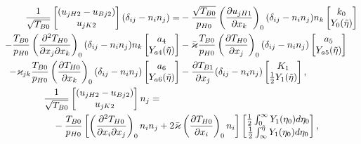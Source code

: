 \begin{gather}
    \begin{aligned}
        \frac1{\sqrt{T_{B0}}}
            \begin{bmatrix} (u_{jH2} - u_{Bj2}) \\ u_{jK2} \end{bmatrix}\deltann{i}{j} =
        &- \frac{\sqrt{T_{B0}}}{p_{H0}}\onwall{\pder[u_{jH1}]{x_k}} \deltann{i}{j}n_k
            \begin{bmatrix} k_0 \\ Y_0(\tilde\eta) \end{bmatrix} \\
        - \frac{T_{B0}}{p_{H0}}\onwall{\pderder[T_{H0}]{x_j}{x_k}} \deltann{i}{j}n_k
            \begin{bmatrix} a_4 \\ Y_{a4}(\tilde\eta) \end{bmatrix}
        &- \bar\kappa\frac{T_{B0}}{p_{H0}}\onwall{\pder[T_{H0}]{x_j}} \deltann{i}{j}
            \begin{bmatrix} a_5 \\ Y_{a5}(\tilde\eta) \end{bmatrix} \\
        - \kappa_{jk}\frac{T_{B0}}{p_{H0}}\onwall{\pder[T_{H0}]{x_k}} \deltann{i}{j}
            \begin{bmatrix} a_6 \\ Y_{a6}(\tilde\eta) \end{bmatrix}
        &- \pder[T_{B1}]{x_j} \deltann{i}{j}
            \begin{bmatrix} K_1 \\ \frac12 Y_1(\tilde\eta) \end{bmatrix},
    \end{aligned}\label{eq:kgf:boundary_u2t}\\
    \begin{multlined}
        \frac1{\sqrt{T_{B0}}}
            \begin{bmatrix} (u_{jH2} - u_{Bj2}) \\ u_{jK2} \end{bmatrix} n_j = \\
        - \frac{T_{B0}}{p_{H0}}\left[ \onwall{\pderder[T_{H0}]{x_i}{x_j}}n_i n_j
            + 2\bar\kappa\onwall{\pder[T_{H0}]{x_i}}n_i \right]
            \begin{bmatrix} \frac12\int_0^\infty Y_1(\eta_0)\dd\eta_0 \\
                \frac12\int_\infty^{\tilde\eta} Y_1(\eta_0)\dd\eta_0 \end{bmatrix},

\end{multlined}
\end{gather}
